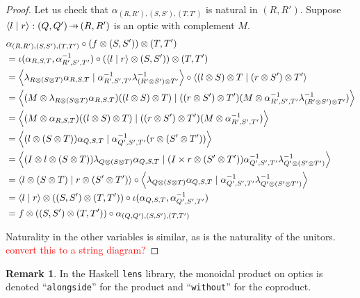 \documentclass[11pt,a4paper]{article}
\theoremstyle{plain}
\theoremstyle{definition}
\newtheorem{remark}[theorem]{Remark}
\newcommand{\lenslib}{\texttt{lens}}
\newcommand{\rep}[2]{{\ensuremath \left\langle #1 \mid #2 \right\rangle}}
\newcommand{\hto}{\ensuremath{\,\mathaccent\shortmid\rightarrow\,}}
\newcommand{\todo}[1]{\textcolor{red}{\small #1}}
\begin{document}
\begin{proof}
  Let us check that $\alpha_{(R, R'), (S, S'), (T, T')}$ is natural in $(R, R')$. Suppose $\rep{l}{r} : (Q, Q') \hto (R, R')$ is an optic with complement $M$.
  \begin{align*}
    &\alpha_{(R, R'), (S, S'), (T, T')} \circ (f \otimes (S, S')) \otimes (T, T') \\
    &= \iota(\alpha_{R,S,T}, \alpha_{R',S',T'}^{-1})  \circ (\rep{l}{r} \otimes (S, S')) \otimes (T, T') \\
    &= \rep{\lambda_{R \otimes (S \otimes T)}\alpha_{R,S,T}}{\alpha_{R',S',T'}^{-1} \lambda^{-1}_{(R' \otimes S') \otimes T'}}  \circ \rep{(l \otimes S) \otimes T}{(r \otimes S') \otimes T'} \\
    &= \rep{(M \otimes \lambda_{R \otimes (S \otimes T)}\alpha_{R,S,T})((l \otimes S) \otimes T)}{((r \otimes S') \otimes T') (M \otimes \alpha_{R',S',T'}^{-1} \lambda^{-1}_{(R' \otimes S') \otimes T'} )} \\
    &=\rep{(M \otimes \alpha_{R,S,T})((l \otimes S) \otimes T)}{((r \otimes S') \otimes T') (M \otimes \alpha_{R',S',T'}^{-1} )} \\
    &= \rep{(l \otimes (S \otimes T))\alpha_{Q,S,T}}{\alpha_{Q',S',T'}^{-1}(r \otimes (S' \otimes T'))} \\
    &= \rep{(I \otimes l \otimes (S \otimes T)) \lambda_{Q \otimes (S \otimes T)}\alpha_{Q,S,T}}{(I \times r \otimes (S' \otimes T')) \alpha_{Q',S',T'}^{-1} \lambda^{-1}_{Q' \otimes (S' \otimes T')}} \\
    &= \rep{l \otimes (S \otimes T)}{r \otimes (S' \otimes T')} \circ \rep{\lambda_{Q \otimes (S \otimes T)}\alpha_{Q,S,T}}{\alpha_{Q',S',T'}^{-1} \lambda^{-1}_{Q' \otimes (S' \otimes T')} } \\
    &= \rep{l}{r} \otimes ((S, S') \otimes (T, T')) \circ \iota(\alpha_{Q,S,T}, \alpha_{Q',S',T'}^{-1}) \\
    &= f \otimes ((S, S') \otimes (T, T')) \circ \alpha_{(Q, Q'), (S, S'), (T, T')}
  \end{align*}

Naturality in the other variables is similar, as is the naturality of the unitors.
  \todo{convert this to a string diagram?}
\end{proof}

\begin{remark}
  In the Haskell \lenslib{} library, the monoidal product on optics is denoted ``\texttt{alongside}'' for the product and ``\texttt{without}'' for the coproduct.
\end{remark}
\end{document}
